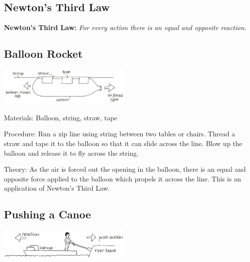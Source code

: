 \begin{multicols}{2}

\section*{Newton's Third Law}
\textbf{Newton's Third Law: }\emph{For every action there is an equal and opposite reaction.}

\subsection{Balloon Rocket}

\begin{center}
\includegraphics[width=0.49\textwidth]{./img/vso/balloon-rocket.jpg}
\end{center}

\begin{description*}
\item[Materials:]{Balloon, string, straw, tape}
\item[Procedure:]{Run a zip line using string between two tables or chairs. Thread a straw and tape it to the balloon so that it can slide across the line. Blow up the balloon and release it to fly across the string.}
\item[Theory:]{As the air is forced out the opening in the balloon, there is an equal and opposite force applied to the balloon which propels it across the line. This is an application of Newton's Third Law.}
\end{description*}

\subsection{Pushing a Canoe}

\begin{center}
\includegraphics[width=0.49\textwidth]{./img/vso/canoe-push.jpg}
\end{center}


\end{multicols}
